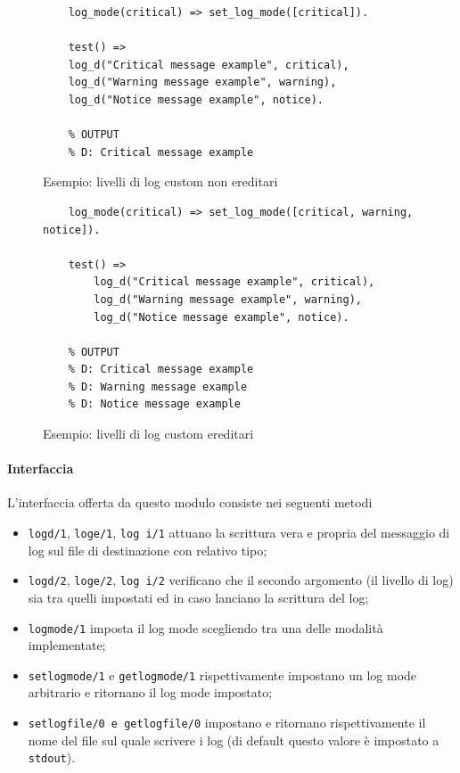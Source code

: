 \documentclass[12pt,a4paper,openright]{book} %
\begin{document}
\begin{figure}
	\begin{verbatim}
	log_mode(critical) => set_log_mode([critical]).

	test() =>
	log_d("Critical message example", critical),
	log_d("Warning message example", warning),
	log_d("Notice message example", notice).

	% OUTPUT
	% D: Critical message example

	\end{verbatim}

	\caption{Esempio: livelli di log custom non ereditari}
	\label{fig:example_loglevel_noinheritance}
\end{figure}

\begin{figure}
	\begin{verbatim}
	log_mode(critical) => set_log_mode([critical, warning, notice]).

	test() =>
		log_d("Critical message example", critical),
		log_d("Warning message example", warning),
		log_d("Notice message example", notice).

	% OUTPUT
	% D: Critical message example
	% D: Warning message example
	% D: Notice message example
	\end{verbatim}
	\caption{Esempio: livelli di log custom ereditari}
	\label{fig:example_loglevel_inheritance}
\end{figure}

\paragraph{Interfaccia}

L'interfaccia offerta da questo modulo consiste nei seguenti metodi
\begin{itemize}
	\item \texttt{log\textunderscore d/1},
          \texttt{log\textunderscore e/1}, \texttt{log\textunderscore
            i/1} attuano la scrittura vera e propria del messaggio di
          log sul file di destinazione con relativo tipo;
	\item \texttt{log\textunderscore d/2},
          \texttt{log\textunderscore e/2}, \texttt{log\textunderscore
            i/2} verificano che il secondo argomento (il livello di
          log) sia tra quelli impostati ed in caso lanciano la
          scrittura del log;
	\item \texttt{log\textunderscore mode/1} imposta il log mode
          scegliendo tra una delle modalità implementate;
	\item \texttt{set\textunderscore log\textunderscore mode/1} e
          \texttt{get\textunderscore log\textunderscore mode/1}
          rispettivamente impostano un log mode arbitrario e ritornano
          il log mode impostato;
	\item \texttt{set\textunderscore log\textunderscore file/0 e
          get\textunderscore log\textunderscore file/0} impostano e
          ritornano rispettivamente il nome del file sul quale
          scrivere i log (di default questo valore è impostato a
          \texttt{stdout}).
\end{itemize}
\end{document}
